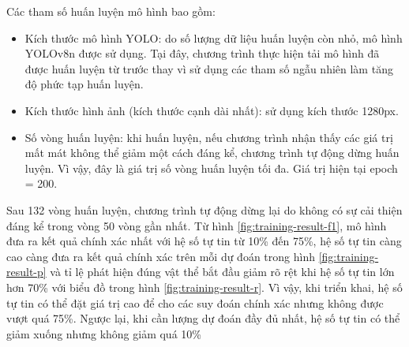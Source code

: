 Các tham số huấn luyện mô hình bao gồm:
\begin{itemize}
	\item Kích thước mô hình YOLO: do số lượng dữ liệu huấn luyện còn nhỏ, mô hình YOLOv8n được sử dụng. Tại đây, chương trình thực hiện tải mô hình đã được huấn luyện từ trước thay vì sử dụng các tham số ngẫu nhiên làm tăng độ phức tạp huấn luyện.
	\item Kích thước hình ảnh (kích thước cạnh dài nhất): sử dụng kích thước 1280px.
	\item Số vòng huấn luyện: khi huấn luyện, nếu chương trình nhận thấy các giá trị mất mát không thể giảm một cách đáng kể, chương trình tự động dừng huấn luyện. Vì vậy, đây là giá trị số vòng huấn luyện tối đa. Giá trị hiện tại epoch = 200.
\end{itemize}

Sau 132 vòng huấn luyện, chương trình tự động dừng lại do không có sự cải thiện đáng kể trong vòng 50 vòng gần nhất. Từ hình \ref{fig:training-result-f1}, mô hình đưa ra kết quả chính xác nhất với hệ số tự tin từ 10\% đến 75\%, hệ số tự tin càng cao càng đưa ra kết quả chính xác trên mỗi dự đoán trong hình \ref{fig:training-result-p} và tỉ lệ phát hiện đúng vật thể bắt đầu giảm rõ rệt khi hệ số tự tin lớn hơn 70\% với biểu đồ trong hình \ref{fig:training-result-r}. Vì vậy, khi triển khai, hệ số tự tin có thể đặt giá trị cao để cho các suy đoán chính xác nhưng không được vượt quá 75\%. Ngược lại, khi cần lượng dự đoán đầy đủ nhất, hệ số tự tin có thể giảm xuống nhưng không giảm quá 10\%

